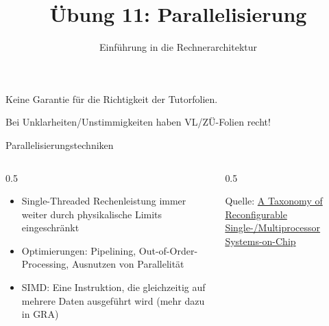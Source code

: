 


\title{Übung 11: Parallelisierung}
\subtitle{Einführung in die Rechnerarchitektur}
\date{}



\maketitle

\begin{frame}[c, fragile]{}{}
	\begin{center}
		\LARGE  Keine Garantie für die Richtigkeit der Tutorfolien.

		\Large Bei Unklarheiten/Unstimmigkeiten haben VL/ZÜ-Folien recht!
	\end{center}
\end{frame}

\begin{frame}[c, fragile]{Parallelisierungstechniken}{}
	\begin{columns}[c]
		\begin{column}{0.5\textwidth}
			\begin{itemize}
				\item Single-Threaded Rechenleistung immer weiter durch physikalische Limits eingeschränkt
				\item Optimierungen: Pipelining, Out-of-Order-Processing, Ausnutzen von Parallelität
				\item SIMD: Eine Instruktion, die gleichzeitig auf mehrere Daten ausgeführt wird (mehr dazu in GRA)

			\end{itemize}
		\end{column}
		\begin{column}{0.5\textwidth}
			\begin{center}
			\end{center}
			\centering
			\tiny{Quelle: \href{https://www.researchgate.net/publication/26639095_A_Taxonomy_of_Reconfigurable_Single-Multiprocessor_Systems-on-Chip}{A Taxonomy of Reconfigurable Single-/Multiprocessor\\Systems-on-Chip}}
		\end{column}
	\end{columns}
\end{frame}


